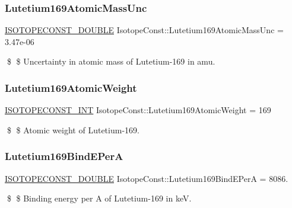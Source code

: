 \subsubsection{\texorpdfstring{Lutetium169\+Atomic\+Mass\+Unc}{Lutetium169AtomicMassUnc}}
{\footnotesize\ttfamily \mbox{\hyperlink{group___isotope_const-_macros_ga8f45a7272ce02c0b4c65c44636ed719a}{I\+S\+O\+T\+O\+P\+E\+C\+O\+N\+S\+T\+\_\+\+D\+O\+U\+B\+LE}} Isotope\+Const\+::\+Lutetium169\+Atomic\+Mass\+Unc = 3.\+47e-\/06}

\$ \$ Uncertainty in atomic mass of Lutetium-\/169 in amu. \mbox{\label{group___isotope_const-_lutetium-_lu169_ga70d0a9b41b7775eb6a881f2b6000f468}} 
\subsubsection{\texorpdfstring{Lutetium169\+Atomic\+Weight}{Lutetium169AtomicWeight}}
{\footnotesize\ttfamily \mbox{\hyperlink{group___isotope_const-_macros_ga5f18360b3e99483a35c32d789e62621c}{I\+S\+O\+T\+O\+P\+E\+C\+O\+N\+S\+T\+\_\+\+I\+NT}} Isotope\+Const\+::\+Lutetium169\+Atomic\+Weight = 169}

\$ \$ Atomic weight of Lutetium-\/169. \mbox{\label{group___isotope_const-_lutetium-_lu169_ga0513bad9b7589cd2629f6a3401faa204}} 
\subsubsection{\texorpdfstring{Lutetium169\+Bind\+E\+PerA}{Lutetium169BindEPerA}}
{\footnotesize\ttfamily \mbox{\hyperlink{group___isotope_const-_macros_ga8f45a7272ce02c0b4c65c44636ed719a}{I\+S\+O\+T\+O\+P\+E\+C\+O\+N\+S\+T\+\_\+\+D\+O\+U\+B\+LE}} Isotope\+Const\+::\+Lutetium169\+Bind\+E\+PerA = 8086.}

\$ \$ Binding energy per A of Lutetium-\/169 in keV. \mbox{\label{group___isotope_const-_lutetium-_lu169_ga81b8498ec3fb01fb2afe66ea395ced13}} 
